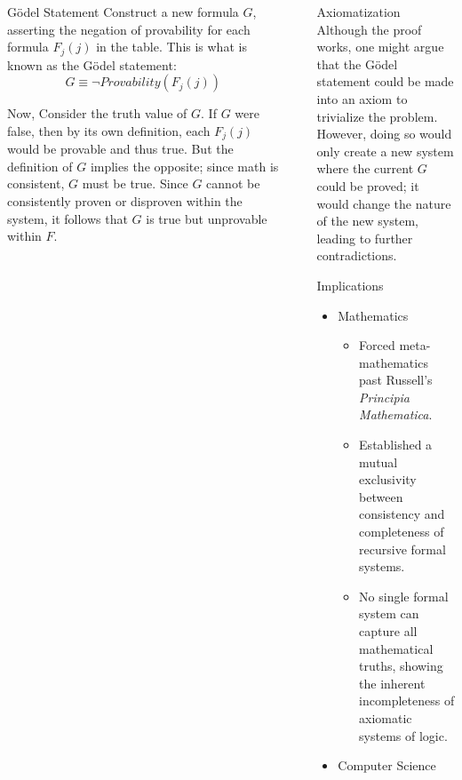 \documentclass[final]{beamer}
\newlength{\sepwidth}
\newlength{\colwidth}
\newcommand{\separatorcolumn}{\begin{column}{\sepwidth}\end{column}}
\begin{document}
\begin{frame}[t]
\begin{columns}[t]
\begin{column}{\colwidth}
\begin{block}{Gödel Statement}
Construct a new formula $G$, asserting the negation of provability for each formula $F_j(j)$ in the table. This is what is known as the Gödel statement:
$$G \equiv \neg Provability(F_j(j))$$

 Now, Consider the truth value of $G$. If $G$ were false, then by its own definition, each $F_j(j)$ would be provable and thus true. But the definition of $G$ implies the opposite; since math is consistent, $G$ must be true. Since $G$ cannot be consistently proven or disproven within the system, it follows that $G$ is true but unprovable within $F$.
 
 \end{block}

\end{column}


\separatorcolumn

\begin{column}{\colwidth}

\begin{block}{Axiomatization}
Although the proof works, one might argue that the Gödel statement could be made into an axiom to trivialize the problem.\\
However, doing so would only create a new system where the current $G$ could be proved; it would change the nature of the new system, leading to further contradictions.

\end{block}

\begin{block}{Implications}

 \begin{itemize}
      \item Mathematics
        \begin{itemize}
        
            \item Forced meta-mathematics past Russell's \textit{Principia Mathematica}.
            \item Established a mutual exclusivity between consistency and completeness of recursive formal systems.
            \item No single formal system can capture all mathematical truths, showing the inherent incompleteness of axiomatic systems of logic.
            
        \end{itemize}
      
      \item Computer Science
        \begin{itemize}


\end{itemize}
\end{itemize}
\end{block}
\end{column}
\end{columns}
\end{frame}
\end{document}
